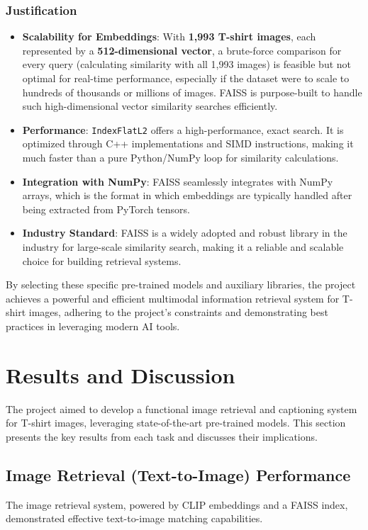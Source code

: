\documentclass{article}
\begin{document}
\subsubsection{Justification}
\begin{itemize}
    \item \textbf{Scalability for Embeddings}: With \textbf{1,993 T-shirt images}, each represented by a \textbf{512-dimensional vector}, a brute-force comparison for every query (calculating similarity with all 1,993 images) is feasible but not optimal for real-time performance, especially if the dataset were to scale to hundreds of thousands or millions of images. FAISS is purpose-built to handle such high-dimensional vector similarity searches efficiently.
    \item \textbf{Performance}: \texttt{IndexFlatL2} offers a high-performance, exact search. It is optimized through C++ implementations and SIMD instructions, making it much faster than a pure Python/NumPy loop for similarity calculations.
    \item \textbf{Integration with NumPy}: FAISS seamlessly integrates with NumPy arrays, which is the format in which embeddings are typically handled after being extracted from PyTorch tensors.
    \item \textbf{Industry Standard}: FAISS is a widely adopted and robust library in the industry for large-scale similarity search, making it a reliable and scalable choice for building retrieval systems.
\end{itemize}
By selecting these specific pre-trained models and auxiliary libraries, the project achieves a powerful and efficient multimodal information retrieval system for T-shirt images, adhering to the project's constraints and demonstrating best practices in leveraging modern AI tools.

\section{Results and Discussion}
\label{sec:results}


The project aimed to develop a functional image retrieval and captioning system for T-shirt images, leveraging state-of-the-art pre-trained models. This section presents the key results from each task and discusses their implications.

\subsection{Image Retrieval (Text-to-Image) Performance}
The image retrieval system, powered by CLIP embeddings and a FAISS index, demonstrated effective text-to-image matching capabilities.
\end{document}
